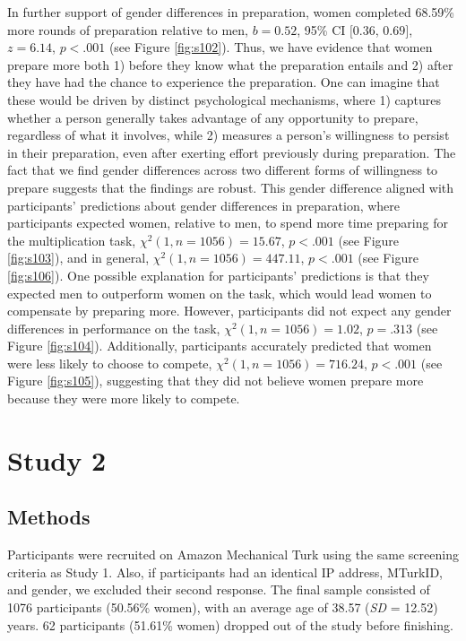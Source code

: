 \documentclass[a4paper, nobind]{templates/ociamthesis}
\begin{document}
In further support of gender differences in preparation, women completed 68.59\% more rounds of preparation relative to men, \(b = 0.52\), 95\% CI \([0.36\), \(0.69]\), \(z = 6.14\), \(p < .001\) (see Figure \ref{fig:s102}). Thus, we have evidence that women prepare more both 1) before they know what the preparation entails and 2) after they have had the chance to experience the preparation. One can imagine that these would be driven by distinct psychological mechanisms, where 1) captures whether a person generally takes advantage of any opportunity to prepare, regardless of what it involves, while 2) measures a person's willingness to persist in their preparation, even after exerting effort previously during preparation. The fact that we find gender differences across two different forms of willingness to prepare suggests that the findings are robust. This gender difference aligned with participants' predictions about gender differences in preparation, where participants expected women, relative to men, to spend more time preparing for the multiplication task, \(\chi^2(1, n = 1056) = 15.67\), \(p < .001\) (see Figure \ref{fig:s103}), and in general, \(\chi^2(1, n = 1056) = 447.11\), \(p < .001\) (see Figure \ref{fig:s106}). One possible explanation for participants' predictions is that they expected men to outperform women on the task, which would lead women to compensate by preparing more. However, participants did not expect any gender differences in performance on the task, \(\chi^2(1, n = 1056) = 1.02\), \(p = .313\) (see Figure \ref{fig:s104}). Additionally, participants accurately predicted that women were less likely to choose to compete, \(\chi^2(1, n = 1056) = 716.24\), \(p < .001\) (see Figure \ref{fig:s105}), suggesting that they did not believe women prepare more because they were more likely to compete.

\hypertarget{study-2}{%
\chapter{Study 2}\label{study-2}}

\hypertarget{methods-1}{%
\section{Methods}\label{methods-1}}

Participants were recruited on Amazon Mechanical Turk using the same screening criteria as Study 1. Also, if participants had an identical IP address, MTurkID, and gender, we excluded their second response. The final sample consisted of 1076 participants (50.56\% women), with an average age of 38.57 (\emph{SD} = 12.52) years. 62 participants (51.61\% women) dropped out of the study before finishing.
\end{document}
